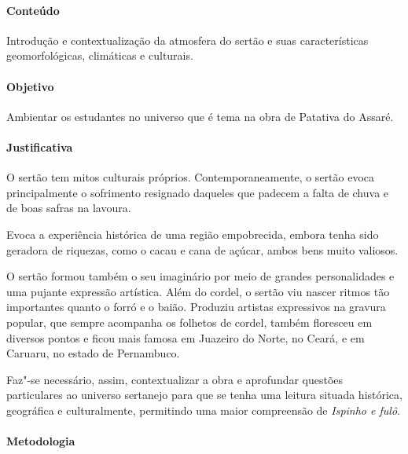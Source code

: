 \documentclass[12pt]{extarticle}
\begin{document}
\paragraph{Conteúdo} Introdução e contextualização da atmosfera do sertão 
e suas características geomorfológicas, climáticas e culturais. 

\paragraph{Objetivo} Ambientar os estudantes no universo que é tema na 
obra de Patativa do Assaré.

\paragraph{Justificativa} O sertão tem mitos culturais próprios. 
Contemporaneamente, o sertão evoca principalmente o sofrimento resignado
daqueles que padecem a falta de chuva e de boas safras
na lavoura. 

Evoca a experiência histórica de uma região
empobrecida, embora tenha sido geradora de riquezas, como
o cacau e cana de açúcar, ambos bens muito valiosos.

O sertão formou também o seu imaginário por meio de
grandes personalidades e uma pujante expressão artística.
Além do cordel, o sertão viu nascer ritmos tão importantes
quanto o forró e o baião. Produziu artistas expressivos na 
gravura popular, que sempre acompanha os folhetos de cordel,
também floresceu em diversos pontos e ficou mais famosa
em Juazeiro do Norte, no Ceará, e em Caruaru, no estado
de Pernambuco.

Faz"-se necessário, assim, contextualizar a obra e aprofundar questões 
particulares ao universo sertanejo para que se tenha uma leitura situada histórica, geográfica e culturalmente, 
permitindo uma maior compreensão de \textit{Ispinho e fulô}. 

\paragraph{Metodologia}
\end{document}
